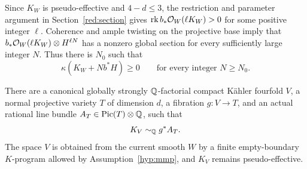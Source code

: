 Since \(K_W\) is pseudo-effective and \(4-d\leq3\), the restriction
and parameter argument in Section~\ref{red:section} gives
\(\operatorname{rk} b_*\mathcal{O}_W(\ell K_W)>0\) for some positive integer \(\ell\).
Coherence and ample twisting on the projective base imply that
\(b_*\mathcal{O}_W(\ell K_W)\otimes H^{\ell N}\) has a nonzero global
section for every sufficiently large integer \(N\). Thus there is
\(N_0\) such that
\begin{equation}\label{pos:all-large-twists}
 \kappa(K_W+Nb^*H)\geq0
 \qquad\text{for every integer }N\geq N_0.
\end{equation}

\begin{proposition}\label{pos:pullback-model}
There are a canonical globally strongly \(\mathbb{Q}\)-factorial compact
Kähler fourfold \(V\), a normal projective variety \(T\) of dimension
\(d\), a fibration \(g:V\to T\), and an actual rational line bundle
\(A_T\in\operatorname{Pic}(T)\otimes\mathbb{Q}\), such that
\begin{equation}\label{pos:canonical-pullback}
 K_V\sim_{\mathbb{Q}}g^*A_T.
\end{equation}
The space \(V\) is obtained from the current smooth \(W\) by a finite
empty-boundary \(K\)-program allowed by Assumption~\ref{hyp:mmp}, and
\(K_V\) remains pseudo-effective.
\end{proposition}

